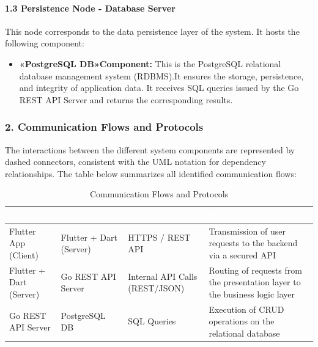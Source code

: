 \documentclass[12pt,a4paper]{report}
\begin{document}
\paragraph{1.3 Persistence Node - Database Server}

This node corresponds to the data persistence layer of the system. It hosts the following component:

\begin{itemize}[leftmargin=0.5cm]
    \item \textbf{ «PostgreSQL DB»Component:} This is the PostgreSQL relational database management system (RDBMS).It ensures the storage, persistence, and integrity of application data. It receives SQL queries issued by the Go REST API Server and returns the corresponding results.
\end{itemize}

\subsubsection*{2. Communication Flows and Protocols}

The interactions between the different system components are represented by dashed connectors, consistent with the UML notation for dependency relationships. The table below summarizes all identified communication flows:

\begin{table}[H]
\centering
\renewcommand{\arraystretch}{1.4}
\begin{tabular}{|>{\arraybackslash}m{3cm}|>{\arraybackslash}m{3cm}|>{\arraybackslash}m{3cm}|>{\arraybackslash}m{4cm}|}
\hline
\cellcolor[HTML]{1F4E79}\textcolor{white}{\textbf{Source}} & \cellcolor[HTML]{1F4E79}\textcolor{white}{\textbf{Destination}} & \cellcolor[HTML]{1F4E79}\textcolor{white}{\textbf{Protocol}} & \cellcolor[HTML]{1F4E79}\textcolor{white}{\textbf{Description}} \\
\hline
Flutter App (Client) & Flutter + Dart (Server) & HTTPS / REST API & Transmission of user requests to the backend via a secured API \\
\hline
Flutter + Dart (Server) & Go REST API Server & Internal API Calls (REST/JSON) & Routing of requests from the presentation layer to the business logic layer \\
\hline
Go REST API Server & PostgreSQL DB & SQL Queries & Execution of CRUD operations on the relational database \\
\hline
\end{tabular}
\caption{Communication Flows and Protocols}
\label{tab:communication}
\end{table}
\end{document}
